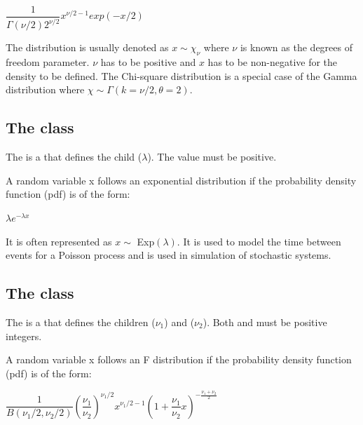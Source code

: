 \begin{center}
$\dfrac{1}{\Gamma(\nu/2)2^{\nu/2}}x^{\nu/2-1}exp(-x/2)$
\end{center}

The distribution is usually denoted as $x\sim\chi_\nu$ where $\nu$ is known as the degrees of freedom parameter. $\nu$ has to be positive and $x$ has to be non-negative for the density to be defined. The Chi-square distribution is a special case of the Gamma distribution where $\chi \sim\Gamma(k=\nu/2,\theta=2)$.

\subsection{The  class}
\label{ExponentialDistribution-class}
\label{exponentialdistribution-class}

The \ExponentialDistribution is a \ContinuousUnivariateDistribution that defines the \UncertValue child  ($\lambda$).  The  value must be positive.

A random variable x follows an exponential distribution if the probability density function (pdf) is of the form:

\begin{center}
$\lambda e^{-\lambda x}$
\end{center}

It is often represented as $x \sim$ Exp$(\lambda)$. It is used to model the time between events for a Poisson process and is used in simulation of stochastic systems.

\subsection{The  class}
\label{FDistribution-class}
\label{fdistribution-class}

The \FDistribution is a \ContinuousUnivariateDistribution that defines the \UncertValue children  ($\nu_1$) and  ($\nu_2$).  Both  and  must be positive integers.

A random variable x follows an F distribution if the probability density function (pdf) is of the form:

\begin{center}
$\dfrac{ 1 } {B(\nu_1/2, \nu_2/2)} \left( \dfrac{\nu_1}{\nu_2}\right)^{\nu_1/2} x^{\nu_1/2 - 1} \left(1 + \dfrac{\nu_1}{\nu_2}x \right)^{-\frac{\nu_1+\nu_2}{2} }$
\end{center}

